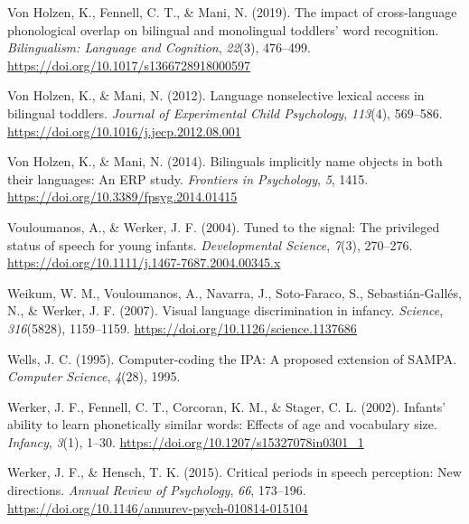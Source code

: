 \documentclass[
  12pt,
  b5paperpaper,
  twoside]{scrreprt}
\newlength{\cslhangindent}
\newlength{\cslentryspacingunit} %
\newenvironment{CSLReferences}[2] %
 {%
  \setlength{\parindent}{0pt}
  \ifodd #1
  \let\oldpar\par
  \def\par{\hangindent=\cslhangindent\oldpar}
  \fi
  \setlength{\parskip}{#2\cslentryspacingunit}
 }%
 {}
\begin{document}
\begin{CSLReferences}{1}{0}
\leavevmode{}%
Von Holzen, K., Fennell, C. T., \& Mani, N. (2019). The impact of
cross-language phonological overlap on bilingual and monolingual
toddlers' word recognition. \emph{Bilingualism: Language and Cognition},
\emph{22}(3), 476--499. \url{https://doi.org/10.1017/s1366728918000597}

\leavevmode{}%
Von Holzen, K., \& Mani, N. (2012). Language nonselective lexical access
in bilingual toddlers. \emph{Journal of Experimental Child Psychology},
\emph{113}(4), 569--586.
\url{https://doi.org/10.1016/j.jecp.2012.08.001}

\leavevmode{}%
Von Holzen, K., \& Mani, N. (2014). Bilinguals implicitly name objects
in both their languages: An {ERP} study. \emph{Frontiers in Psychology},
\emph{5}, 1415. \url{https://doi.org/10.3389/fpsyg.2014.01415}

\leavevmode{}%
Vouloumanos, A., \& Werker, J. F. (2004). Tuned to the signal: The
privileged status of speech for young infants. \emph{Developmental
Science}, \emph{7}(3), 270--276.
\url{https://doi.org/10.1111/j.1467-7687.2004.00345.x}

\leavevmode{}%
Weikum, W. M., Vouloumanos, A., Navarra, J., Soto-Faraco, S.,
Sebastián-Gallés, N., \& Werker, J. F. (2007). Visual language
discrimination in infancy. \emph{Science}, \emph{316}(5828), 1159--1159.
\url{https://doi.org/10.1126/science.1137686}

\leavevmode{}%
Wells, J. C. (1995). Computer-coding the {IPA}: A proposed extension of
{SAMPA}. \emph{Computer Science}, \emph{4}(28), 1995.

\leavevmode{}%
Werker, J. F., Fennell, C. T., Corcoran, K. M., \& Stager, C. L. (2002).
Infants' ability to learn phonetically similar words: Effects of age and
vocabulary size. \emph{Infancy}, \emph{3}(1), 1--30.
\url{https://doi.org/10.1207/s15327078in0301_1}

\leavevmode{}%
Werker, J. F., \& Hensch, T. K. (2015). Critical periods in speech
perception: New directions. \emph{Annual Review of Psychology},
\emph{66}, 173--196.
\url{https://doi.org/10.1146/annurev-psych-010814-015104}


\end{CSLReferences}
\end{document}
